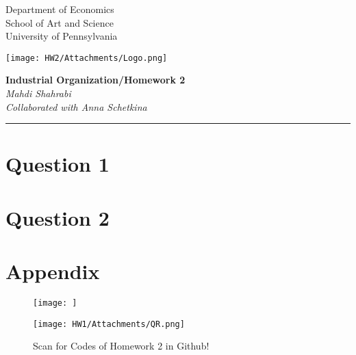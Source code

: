 \documentclass[11pt,letterpaper]{article}
\begin{document}
\usetikzlibrary{positioning}
\pagestyle{plain}
\begin{flushleft}
Department of Economics \hfill \\
School of Art and Science\\
University of Pennsylvania
\end{flushleft}

\begin{flushright}\vspace{-2cm}
\texttt{[image: HW2/Attachments/Logo.png]}
\end{flushright}
 
\begin{center}\vspace{1cm}
\textbf{\large Industrial Organization/Homework 2}\\   %
\textit{Mahdi Shahrabi} \\\textit{Collaborated with Anna Schetkina}\\                         %

\end{center}
\rule{\linewidth}{0.4mm}

\section{Question 1}


\newpage
\section{Question 2}


\newpage
\section{Appendix}
\begin{figure}[h]
    \centering
    \texttt{[image: ]}
    \caption{Scan for Codes of Homework 2 in Github!}
\texttt{[image: HW1/Attachments/QR.png]}
\end{figure}


\end{document}
